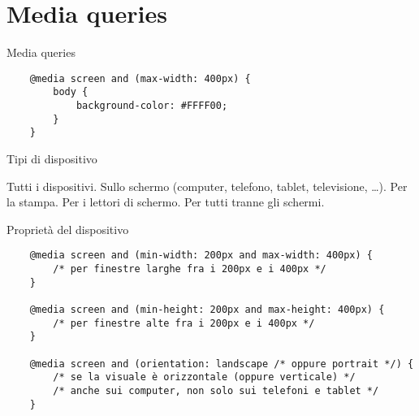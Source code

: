 \section{Media queries}

\begin{frame}[fragile]{Media queries}\transfade\centering
  \begin{verbatim}
    @media screen and (max-width: 400px) {
        body {
            background-color: #FFFF00;
        }
    }
  \end{verbatim}  
\end{frame}

\begin{frame}[fragile]{Tipi di dispositivo}\transfade\centering
  \begin{description}[<+->]
     Tutti i dispositivi.
     Sullo schermo (computer, telefono, tablet, televisione, \dots).
     Per la stampa.
     Per i lettori di schermo.
    \bigskip    
     Per tutti tranne gli schermi.
  \end{description}
\end{frame}

\begin{frame}[fragile]{Proprietà del dispositivo}\transfade\centering
  \begin{verbatim}
    @media screen and (min-width: 200px and max-width: 400px) {
        /* per finestre larghe fra i 200px e i 400px */
    }
    
    @media screen and (min-height: 200px and max-height: 400px) {
        /* per finestre alte fra i 200px e i 400px */
    }
    
    @media screen and (orientation: landscape /* oppure portrait */) {
        /* se la visuale è orizzontale (oppure verticale) */
        /* anche sui computer, non solo sui telefoni e tablet */
    }
  \end{verbatim}  
\end{frame}
